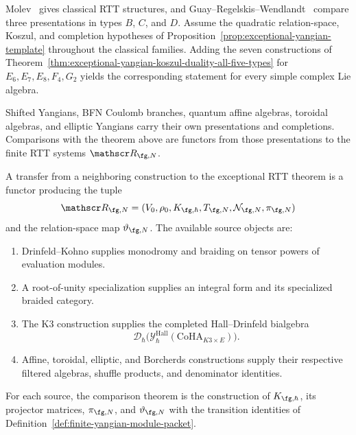 \begin{corollary}
\label{cor:exceptional-yangian-all-simple}
Molev~\cite{Molev07} gives classical RTT structures, and
Guay--Regelskis--Wendlandt~\cite{GRW18} compare three presentations
in types $B$, $C$, and $D$.  Assume the quadratic relation-space,
Koszul, and completion hypotheses of
Proposition~\ref{prop:exceptional-yangian-template} throughout the
classical families.  Adding the seven constructions of
Theorem~\ref{thm:exceptional-yangian-koszul-duality-all-five-types} for
$E_6,E_7,E_8,F_4,G_2$ yields the corresponding statement for every
simple complex Lie algebra.
\end{corollary}

\begin{remark}
\label{rem:exceptional-yangian-does-not-close}
Shifted Yangians, BFN Coulomb branches, quantum affine algebras,
toroidal algebras, and elliptic Yangians carry their own presentations
and completions.  Comparisons with the theorem above are functors from
those presentations to the finite RTT systems $\mathscr R_{\fg,N}$.
\end{remark}

\begin{proposition}
\label{prop:exceptional-yangian-no-dk-root-k3-promotion}
A transfer from a neighboring construction to the exceptional RTT
theorem is a functor producing the tuple
\[
\mathscr R_{\fg,N}
=(V_0,\rho_0,K_{\fg,\hbar},T_{\fg,N},
\mathcal N_{\fg,N},\pi_{\fg,N})
\]
and the relation-space map
$\vartheta_{\fg,N}$.  The available source objects are:
\begin{enumerate}[label=\textup{(\alph*)}]
\item Drinfeld--Kohno supplies monodromy and braiding on tensor powers
of evaluation modules.
\item A root-of-unity specialization supplies an integral form and its
specialized braided category.
\item The K3 construction supplies the completed Hall--Drinfeld
bialgebra
\[
\mathcal D_\hbar\bigl(
\mathcal Y^{\mathrm{Hall}}_\hbar(\mathrm{CoHA}_{K3\times E})
\bigr).
\]
\item Affine, toroidal, elliptic, and Borcherds constructions supply
their respective filtered algebras, shuffle products, and denominator
identities.
\end{enumerate}
For each source, the comparison theorem is the construction of
$K_{\fg,\hbar}$, its projector matrices, $\pi_{\fg,N}$, and
$\vartheta_{\fg,N}$ with the transition identities of
Definition~\ref{def:finite-yangian-module-packet}.
\end{proposition}

